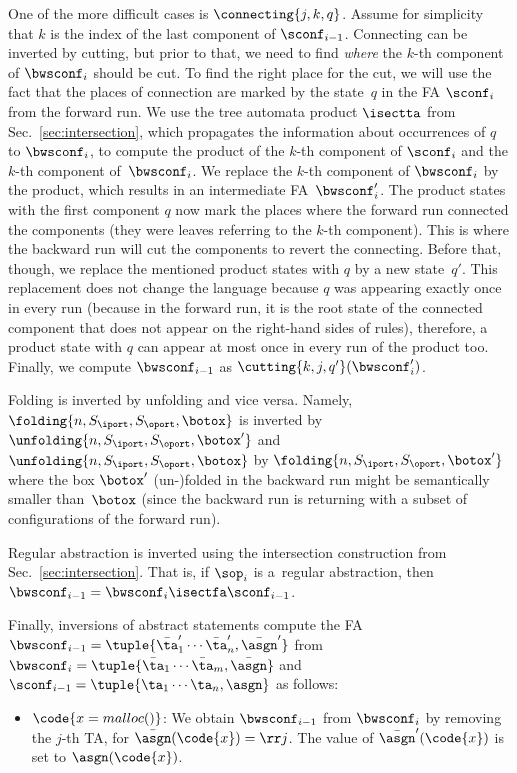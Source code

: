 {One of the more difficult cases is 
$\connecting{j,k,q}$. %
Assume for simplicity that $k$ is the index of the last component of $\sconf_{i-1}$.
%
Connecting can be inverted by cutting, but prior to that, we need to find
\emph{where} the $k$-th component of $\bwsconf_i$ should be cut.
To find the right place for the cut, we will
use the fact that the places of connection are marked by the
state~$q$ in the FA $\sconf_i$ from the forward run.
%
We use the tree automata product $\isectta$ from
Sec.~\ref{sec:intersection}, which
propagates the information about occurrences of $q$ to $\bwsconf_{i}$,
to compute the product of the $k$-th
component of $\sconf_{i}$ and the $k$-th component of~$\bwsconf_i$.
%
We replace the $k$-th component of $\bwsconf_i$ by the product, 
which results in an intermediate FA~$\bwsconf_i'$.
%
The product states with the first component $q$ now mark the places where the forward run connected the components (they were leaves referring to the $k$-th component).
%
This is where the backward run will cut the components to revert the connecting. 
%
Before that, though, we replace the mentioned product states with $q$ by a new state~$q'$.
This replacement does not change the language because $q$ was appearing
exactly once in every run (because in the forward run, it is the root state of the connected component that does not appear on the right-hand sides of rules), therefore, 
a product state with $q$ can appear at most once in
every run of the product too.
%
Finally, we compute $\bwsconf_{i-1}$ as $\cutting{k,j,q'}(\bwsconf_i')$.

Folding is inverted by unfolding and vice versa. Namely, 
$\folding{n,S_{\iport},S_{\oport},\botox}$ is inverted by 
$\unfolding{n,S_{\iport},S_{\oport},\botox'}$ and  
$\unfolding{n,S_{\iport},S_{\oport},\botox}$ by 
$\folding{n,S_{\iport},S_{\oport},\botox'}$ where the box $\botox'$ (un-)folded in
the backward run might be semantically smaller than~$\botox$ (since the
backward run is returning with a subset of configurations of the forward run). 

Regular abstraction is inverted using the intersection construction from Sec.~\ref{sec:intersection}. 
That is, if $\sop_i$ is a~regular abstraction, 
then $\bwsconf_{i-1} = \bwsconf_{i} \isectfa\sconf_{i-1}$.

Finally, inversions of abstract statements compute the FA $\bwsconf_{i-1} =
\tuple{\bar\ta'_1 \cdots \bar\ta'_n, \bar\asgn'}$
from~$\bwsconf_{i} = \tuple{\bar\ta_1 \cdots \bar\ta_m, \bar\asgn}$ and
$\sconf_{i-1} = \tuple{\ta_1 \cdots \ta_n, \asgn}$ as follows:
%
\begin{itemize}
  \item $\code{x = malloc()}$: We obtain $\bwsconf_{i-1}$ from $\bwsconf_{i}$
    by removing the $j$-th TA, for $\bar\asgn(\code{x}) = \rr j$.
    The value of $\bar\asgn'(\code{x})$ is set to $\asgn(\code{x})$.


\end{itemize}}
